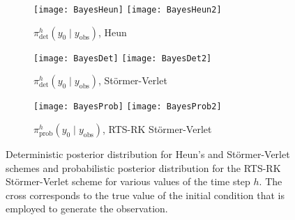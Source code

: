 \documentclass{siamart1116}
\numberwithin{theorem}{section}
\newcommand{\corr}[1]{{\color{red}#1}}
\begin{document}
\begin{figure}
\begin{subfigure}{\textwidth}
	\centering
	\texttt{[image: BayesHeun]}
	\texttt{[image: BayesHeun2]}
	\caption{$\pi^h_{\mathrm{det}}(y_0\mid y_{\mathrm{obs}})$, Heun}
	\label{fig:BayesA}
\end{subfigure}	
\begin{subfigure}{\textwidth}
	\centering
	\texttt{[image: BayesDet]}
	\texttt{[image: BayesDet2]}
	\caption{$\pi^h_{\mathrm{det}}(y_0\mid y_{\mathrm{obs}})$, Störmer-Verlet}
	\label{fig:BayesB}
\end{subfigure}
\begin{subfigure}{\textwidth}
	\centering
	\texttt{[image: BayesProb]}
	\texttt{[image: BayesProb2]}
	\caption{$\pi^h_{\mathrm{prob}}(y_0\mid y_{\mathrm{obs}})$, RTS-RK Störmer-Verlet}
	\label{fig:BayesC}
\end{subfigure}
\caption{Deterministic posterior distribution for Heun's and Störmer-Verlet schemes and probabilistic posterior distribution for the RTS-RK Störmer-Verlet scheme for various values of the time step $h$. \corr{The cross corresponds to the true value of the initial condition that is employed to generate the observation.}}
\label{fig:Bayes}
\end{figure}



\end{document}
